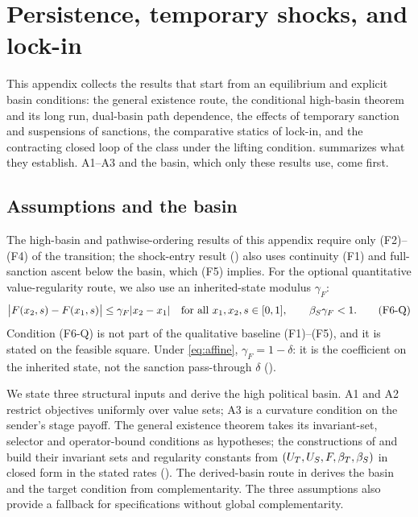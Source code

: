 \section{Persistence, temporary shocks, and lock-in}
\label{app:persistence}

This appendix collects the results that start from an equilibrium and explicit
basin conditions: the general existence route, the conditional high-basin
theorem and its long run, dual-basin path dependence, the effects of temporary
sanction and suspensions of sanctions, the comparative statics of lock-in, and the
contracting closed loop of the class under the lifting condition. 
summarizes what they establish. A1--A3 and the
basin, which only these results use, come first.

\subsection{Assumptions and the basin}
\label{sec:assumptions}

The high-basin and pathwise-ordering results of this appendix require only
\textup{(F2)--(F4)} of the transition; the shock-entry result
() also uses continuity \textup{(F1)} and full-sanction
ascent below the basin, which \textup{(F5)} implies. For the optional
quantitative value-regularity route, we also use an inherited-state
modulus $\gamma_F$:
\begingroup
\renewcommand{\theHequation}{F6Q}
\begin{equation}
\bigl|F(x_2,s)-F(x_1,s)\bigr|
\leq \gamma_F |x_2-x_1|
\quad\text{for all }x_1,x_2,s\in[0,1],
\qquad
\beta_S\gamma_F<1.
\tag{F6-Q}\label{eq:F-state-lip}
\end{equation}
\endgroup
Condition \textup{(F6-Q)} is not part of the qualitative baseline
\textup{(F1)--(F5)}, and it is stated on the feasible square. Under
\eqref{eq:affine}, $\gamma_F=1-\delta$: it is the coefficient on the inherited
state, not the sanction pass-through $\delta$ ().

We state three structural inputs and derive the high political basin.
A1 and A2 restrict objectives uniformly over value sets; A3 is a
curvature condition on the sender's stage payoff. The general existence
theorem takes its invariant-set, selector and operator-bound conditions as
hypotheses; the constructions of  and
 build their invariant sets and regularity
constants from $(U_T,U_S,F,\beta_T,\beta_S)$ in closed form in the stated rates
(). The derived-basin
route in  derives the basin and the target condition from
complementarity. The three assumptions also provide a fallback for
specifications without global complementarity.

